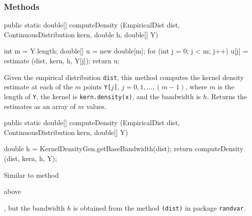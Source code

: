 \subsubsection* {Methods}

\begin{code}

   public static double[] computeDensity (EmpiricalDist dist,
                                          ContinuousDistribution kern,
                                          double h, double[] Y)\begin{hide} {
      int m = Y.length;
      double[] u = new double[m];
      for (int j = 0; j < m; j++)
         u[j] = estimate (dist, kern, h, Y[j]);
      return u;
   }\end{hide}
\end{code}
 \begin{tabb}
Given the empirical distribution \texttt{dist}, this method computes the 
kernel density estimate at each of the $m$ points \texttt{Y[$j$]},
 $j= 0, 1, \ldots, (m-1)$, where $m$ is the length of \texttt{Y}, the kernel
 is \texttt{kern.density(x)},
 and the bandwidth is $h$. Returns the estimates as an array of $m$ values.
\end{tabb}
\begin{code}

   public static double[] computeDensity (EmpiricalDist dist,
                                          ContinuousDistribution kern,
                                          double[] Y)\begin{hide} {
      double h = KernelDensityGen.getBaseBandwidth(dist);
      return computeDensity (dist, kern, h, Y);
   }\end{hide}
\end{code}
 \begin{tabb}
Similar to method 
\begin{latexonly}{ above}\end{latexonly},
but the bandwidth $h$ is obtained from the method
\texttt{(dist)} in package \texttt{randvar}.
\end{tabb}

\begin{code}\begin{hide}
}\end{hide}
\end{code}
